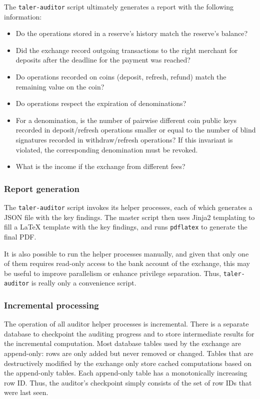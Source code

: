 The \texttt{taler-auditor} script ultimately generates a report with the
following information:
\begin{itemize}
  \item Do the operations stored in a reserve's history match the reserve's balance?
  \item Did the exchange record outgoing transactions to the right merchant for
    deposits after the deadline for the payment was reached?
  \item Do operations recorded on coins (deposit, refresh, refund) match the remaining
    value on the coin?
  \item Do operations respect the expiration of denominations?
  \item For a denomination, is the number of pairwise different coin public
    keys recorded in deposit/refresh operations smaller or equal to the number
    of blind signatures recorded in withdraw/refresh operations?
    If this invariant is violated, the corresponding denomination must be revoked.
  \item What is the income if the exchange from different fees?
\end{itemize}

\subsubsection{Report generation}

The \texttt{taler-auditor} script invokes its helper processes, each of
which generates a JSON file with the key findings. The master script then
uses Jinja2 templating to fill a LaTeX template with the key findings, and
runs \texttt{pdflatex} to generate the final PDF.

It is also possible to run the helper processes manually, and given that only
one of them requires read-only access to the bank account of the exchange,
this may be useful to improve parallelism or enhance privilege
separation. Thus, \texttt{taler-auditor} is really only a convenience script.

\subsubsection{Incremental processing}

The operation of all auditor helper processes is incremental.  There is a separate
database to checkpoint the auditing progress and to store intermediate results
for the incremental computation.  Most database tables used by the exchange are
append-only:  rows are only added but never removed or changed.  Tables that
are destructively modified by the exchange only store cached computations based
on the append-only tables.  Each append-only table has a monotonically
increasing row ID.  Thus, the auditor's checkpoint simply consists of the set of
row IDs that were last seen.

